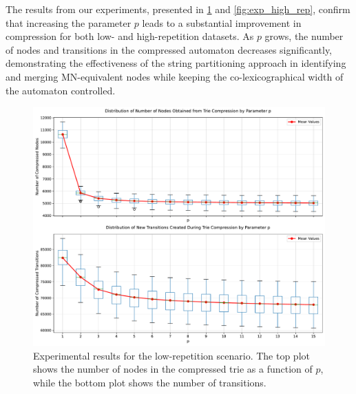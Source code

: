 The results from our experiments, presented in \cref{fig:exp_low_rep} and \cref{fig:exp_high_rep}, confirm that increasing the parameter $p$ leads to a substantial improvement in compression for both low- and high-repetition datasets. As $p$ grows, the number of nodes and transitions in the compressed automaton decreases significantly, demonstrating the effectiveness of the string partitioning approach in identifying and merging MN-equivalent nodes while keeping the co-lexicographical width of the automaton controlled.

\begin{figure}[H]
    \centering
    \includegraphics[width=1\linewidth]{Immagini/tree_compression_analysis_low.pdf}
    \caption{Experimental results for the low-repetition scenario. The top plot shows the number of nodes in the compressed trie as a function of $p$, while the bottom plot shows the number of transitions.}
    \label{fig:exp_low_rep}
\end{figure}


